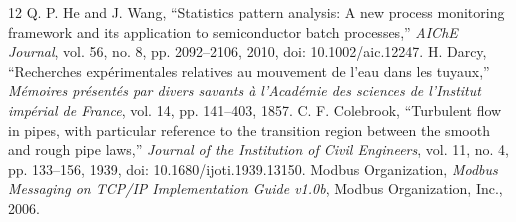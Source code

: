 \documentclass[fontset=none, a4paper, 12pt]{ctexart}
\begin{document}
\begin{doublespace}
\begin{thebibliography}{12}
 Q. P. He and J. Wang, ``Statistics pattern analysis: A new process monitoring framework and its application to semiconductor batch processes,'' \emph{AIChE Journal}, vol. 56, no. 8, pp. 2092--2106, 2010, doi: 10.1002/aic.12247.
 H. Darcy, ``Recherches exp{\'e}rimentales relatives au mouvement de l'eau dans les tuyaux,'' \emph{M{\'e}moires pr{\'e}sent{\'e}s par divers savants {\`a} l'Acad{\'e}mie des sciences de l'Institut imp{\'e}rial de France}, vol. 14, pp. 141--403, 1857.
 C. F. Colebrook, ``Turbulent flow in pipes, with particular reference to the transition region between the smooth and rough pipe laws,'' \emph{Journal of the Institution of Civil Engineers}, vol. 11, no. 4, pp. 133--156, 1939, doi: 10.1680/ijoti.1939.13150.
 Modbus Organization, \emph{Modbus Messaging on TCP/IP Implementation Guide v1.0b}, Modbus Organization, Inc., 2006.
\end{thebibliography}

\end{doublespace}
\end{document}
